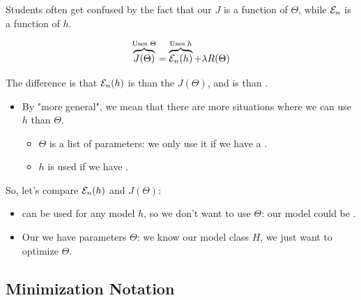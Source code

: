         \begin{clarification}
           Students often get confused by the fact that our  $J$ is a function of $\Theta$, while  $\mathcal{E}_n$ is a function of $h$.

           \begin{equation*}
               \overbrace{
                    J(\Theta)}^{\text{Uses } \Theta} 
                =
                \overbrace{
                    \mathcal{E}_n(h)}^{\text{Uses } h} 
                + \lambda R(\Theta)
           \end{equation*}
            
            The difference is that  $\mathcal{E}_n(h)$ is  than the  $J(\Theta)$, and  is  than \purp{$\Theta$}.

            \begin{itemize}
                \item By "more general", we mean that there are more situations where we can use $h$ than $\Theta$.
                \begin{itemize}
                    \item $\Theta$ is a list of parameters: we only use it if we have a .
                    \item $h$ is used if we have .
                \end{itemize}
            \end{itemize}

            
            So, let's compare $\mathcal{E}_n(h)$ and $J(\Theta)$:
            
            \begin{itemize}
                \item {} 
                can be used for any model $h$, so we don't want to use $\Theta$: our model could be .
                
                \item Our   we have parameters $\Theta$: we know our model class $H$, we just want to optimize $\Theta$.
            \end{itemize}
            
        \end{clarification}
        
    \subsection{Minimization Notation}
        
